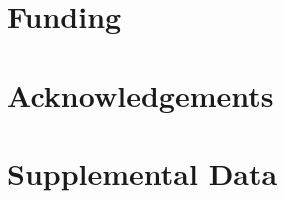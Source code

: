 \documentclass[utf8]{article}
\begin{document}
	
	
	\section*{Funding}
	
	\section*{Acknowledgements}
	
	\section*{Supplemental Data}
	
	
	
	
	
	
\end{document}
